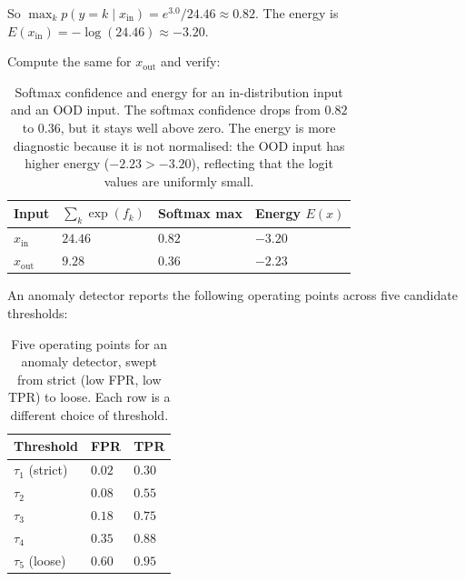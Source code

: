 So $\max_k p(y{=}k \mid x_{\mathrm{in}}) = e^{3.0}/24.46 \approx 0.82$.
The energy is $E(x_{\mathrm{in}}) = -\log(24.46) \approx -3.20$.

Compute the same for $x_{\mathrm{out}}$ and verify:

\begin{table}[ht]
\centering
\begin{tabular}{p{}p{}p{}p{}}
    \toprule
    \textbf{Input} & \textbf{$\sum_k \exp(f_k)$} & \textbf{Softmax max} & \textbf{Energy $E(x)$} \\
    \midrule
    $x_{\mathrm{in}}$  & $24.46$ & $0.82$ & $-3.20$ \\
    $x_{\mathrm{out}}$ & $9.28$  & $0.36$ & $-2.23$ \\
    \bottomrule
\end{tabular}
\vspace{2em}
\caption{Softmax confidence and energy for an in-distribution input and an OOD input. The softmax confidence drops from $0.82$ to $0.36$, but it stays well above zero. The energy is more diagnostic because it is not normalised: the OOD input has higher energy ($-2.23 > -3.20$), reflecting that the logit values are uniformly small.}
\label{tab:energy_softmax}
\end{table}


\vspace{2.5em}

An anomaly detector reports the following operating points across five candidate thresholds:

\begin{table}[ht]
\centering
\begin{tabular}{p{}p{}p{}}
    \toprule
    \textbf{Threshold} & \textbf{FPR} & \textbf{TPR} \\
    \midrule
    $\tau_1$ (strict) & $0.02$ & $0.30$ \\
    $\tau_2$           & $0.08$ & $0.55$ \\
    $\tau_3$           & $0.18$ & $0.75$ \\
    $\tau_4$           & $0.35$ & $0.88$ \\
    $\tau_5$ (loose)   & $0.60$ & $0.95$ \\
    \bottomrule
\end{tabular}
\vspace{2em}
\caption{Five operating points for an anomaly detector, swept from strict (low FPR, low TPR) to loose. Each row is a different choice of threshold.}
\label{tab:roc_sweep}
\end{table}

